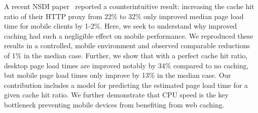 A recent NSDI paper~\cite{flywheel} reported a counterintuitive result:
increasing the cache hit ratio of their HTTP proxy from 22\% to 32\% only improved median page load time for mobile clients by 1-2\%.
Here, we seek to understand why improved caching had such a negligible effect on mobile performance.
We reproduced these results in a controlled, mobile environment and observed
comparable reductions of 1\% in the median case.
Further, we show that with a perfect cache hit ratio, desktop page load times are improved notably by 34\% compared to no caching, but mobile page load times only improve by 13\% in the median case. Our contribution includes a model for predicting the estimated page load time for a given cache hit ratio.
We further demonstrate that CPU speed is the key bottleneck preventing mobile devices from benefiting from web caching.



